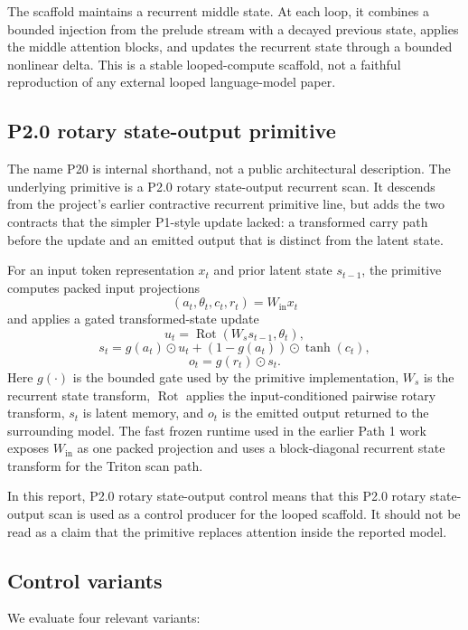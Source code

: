\documentclass[11pt]{article}
\newcommand{\pshort}{P20}
\newcommand{\pname}{P2.0 rotary state-output}
\newcommand{\pcontrol}{P2.0 rotary state-output control}
\begin{document}
The scaffold maintains a recurrent middle state. At each loop, it combines a
bounded injection from the prelude stream with a decayed previous state, applies
the middle attention blocks, and updates the recurrent state through a bounded
nonlinear delta. This is a stable looped-compute scaffold, not a faithful
reproduction of any external looped language-model paper.

\subsection{P2.0 rotary state-output primitive}

The name \pshort{} is internal shorthand, not a public architectural
description. The underlying primitive is a \pname{} recurrent scan. It descends
from the project's earlier contractive recurrent primitive line, but adds the
two contracts that the simpler P1-style update lacked: a transformed carry path
before the update and an emitted output that is distinct from the latent state.

For an input token representation $x_t$ and prior latent state $s_{t-1}$, the
primitive computes packed input projections
\[
  (a_t,\theta_t,c_t,r_t) = W_{\mathrm{in}} x_t
\]
and applies a gated transformed-state update
\[
  u_t = \operatorname{Rot}(W_s s_{t-1}, \theta_t),
\]
\[
  s_t = g(a_t) \odot u_t + (1 - g(a_t)) \odot \tanh(c_t),
\]
\[
  o_t = g(r_t) \odot s_t.
\]
Here $g(\cdot)$ is the bounded gate used by the primitive implementation,
$W_s$ is the recurrent state transform, $\operatorname{Rot}$ applies the
input-conditioned pairwise rotary transform, $s_t$ is latent memory, and $o_t$
is the emitted output returned to the surrounding model. The fast frozen
runtime used in the earlier Path 1 work exposes $W_{\mathrm{in}}$ as one packed
projection and uses a block-diagonal recurrent state transform for the Triton
scan path.

In this report, \pcontrol{} means that this \pname{} scan is used as a control
producer for the looped scaffold. It should not be read as a claim that the
primitive replaces attention inside the reported model.

\subsection{Control variants}

We evaluate four relevant variants:
\end{document}
